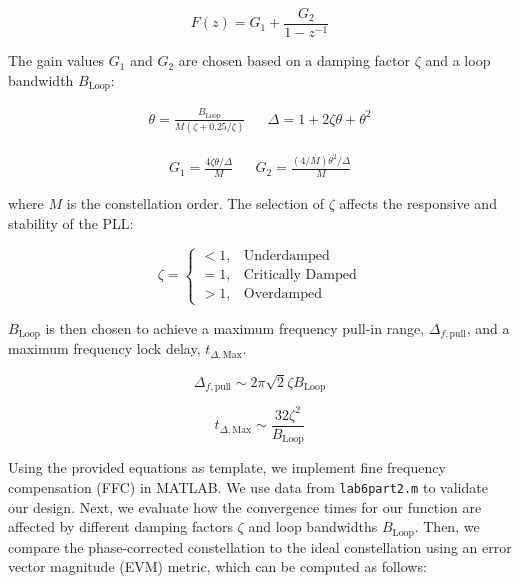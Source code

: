 \documentclass{article}
\begin{document}
\begin{equation}
F(z) = G_1 + \frac{G_2}{1-z^{-1}}
\end{equation}

\noindent The gain values $G_1$ and $G_2$ are chosen based on a damping factor $\zeta$ and a loop bandwidth $B_\text{Loop}$:

\begin{align}
	\theta = \frac{B_{\text{Loop}}}{M(\zeta + 0.25/\zeta)} && \Delta = 1 + 2\zeta\theta + \theta^2
\end{align}

\begin{align}
	G_1 = \frac{4\zeta\theta/\Delta}{M} && G_2 = \frac{(4/M)\theta^2/\Delta}{M}
\end{align}

\noindent where $M$ is the constellation order. The selection of $\zeta$ affects the responsive and stability of the PLL:

\begin{equation}
\zeta = \begin{cases}
< 1, & \text{Underdamped}\\
= 1, & \text{Critically Damped}\\
> 1, & \text{Overdamped}
\end{cases}
\end{equation}

\noindent $B_\text{Loop}$ is then chosen to achieve a maximum frequency pull-in range, $\Delta_{f,\text{pull}}$, and a maximum frequency lock delay, $t_{\Delta,\text{Max}}$.


\begin{equation}
	\label{eq::max_freq_correct}
	\Delta_{f,\text{pull}} \sim 2\pi\sqrt{2}\zeta{B_\text{Loop}}\end{equation}

\begin{equation}
	t_{\Delta,\text{Max}} \sim \frac{32\zeta^2}{B_\text{Loop}}\end{equation}
	
Using the provided equations as template, we implement fine frequency compensation (FFC) in MATLAB. We use data from \texttt{lab6part2.m} to validate our design. Next, we evaluate how the convergence times for our function are affected by different damping factors $\zeta$ and loop bandwidths $B_\text{Loop}$. Then, we compare the phase-corrected constellation to the ideal constellation using an error vector magnitude (EVM) metric, which can be computed as follows:
\end{document}
